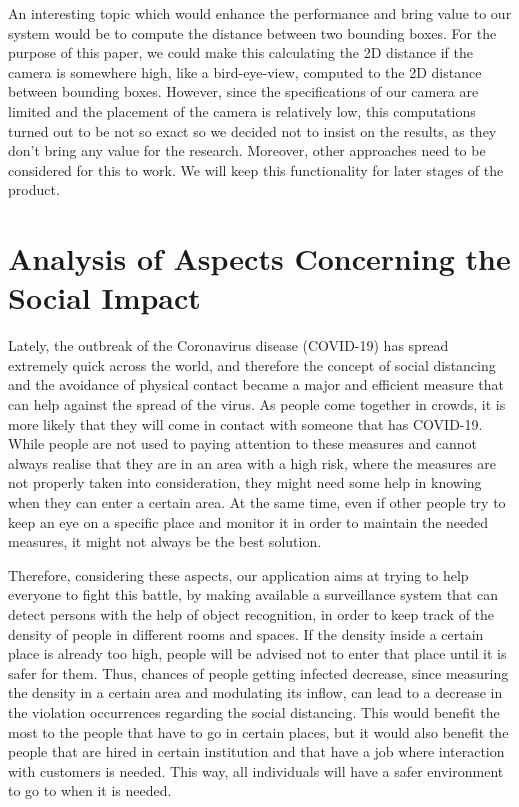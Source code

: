 \documentclass[runningheads,a4paper,11pt]{report}
\begin{document}
An interesting topic which would enhance the performance and bring value to our system would be to compute the distance between two bounding boxes. For the purpose of this paper, we could make this calculating the 2D distance if the camera is somewhere high, like a bird-eye-view, computed to the 2D distance between bounding boxes. However, since the specifications of our camera are limited and the placement of the camera is relatively low, this computations turned out to be not so exact so we decided not to insist on the results, as they don't bring any value for the research. Moreover, other approaches need to be considered for this to work. We will keep this functionality for later stages of the product.

\section{Analysis of Aspects Concerning the Social Impact}
\label{section:social}

Lately, the outbreak of the Coronavirus disease (COVID-19) has spread extremely quick across the world, and therefore the concept of social distancing and the avoidance of physical contact became a major and efficient measure that can help against the spread of the virus. As people come together in crowds, it is more likely that they will come in contact with someone that has COVID-19. While people are not used to paying attention to these measures and cannot always realise that they are in an area with a high risk, where the measures are not properly taken into consideration, they might need some help in knowing when they can enter a certain area. At the same time, even if other people try to keep an eye on a specific place and monitor it in order to maintain the needed measures, it might not always be the best solution.

Therefore, considering these aspects, our application aims at trying to help everyone to fight this battle, by making available a surveillance system that can detect persons with the help of object recognition, in order to keep track of the density of people in different rooms and spaces. If the density inside a certain place is already too high, people will be advised not to enter that place until it is safer for them. Thus, chances of people getting infected decrease, since measuring the density in a certain area and modulating its inflow, can lead to a decrease in the violation occurrences regarding the social distancing. This would benefit the most to the people that have to go in certain places, but it would also benefit the people that are hired in certain institution and that have a job where interaction with customers is needed. This way, all individuals will have a safer environment to go to when it is needed.
\end{document}
